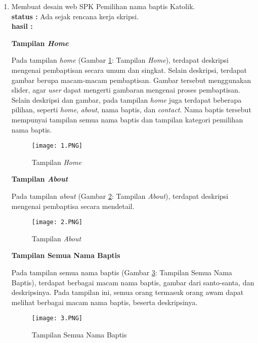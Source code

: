 \documentclass[a4paper,twoside]{article}
\begin{document}
\begin{enumerate}
\begin{enumerate}
\begin{enumerate}
\begin{itemize}
                                
                                \end{itemize}
                \end{enumerate}

\end{enumerate}
\item Membuat desain web SPK Pemilihan nama baptis Katolik.\\
		{\bf status :} Ada sejak rencana kerja skripsi.\\
		{\bf hasil :}
		
\textbf{Tampilan \textit{Home}}
		
		Pada tampilan \textit{home} (Gambar \ref{fig:home}: Tampilan \textit{Home}), terdapat deskripsi mengenai pembaptisan secara umum dan singkat. Selain deskripsi, terdapat gambar berupa macam-macam pembaptisan. Gambar tersebut menggunakan slider, agar \textit{user} dapat mengerti gambaran mengenai proses pembaptisan. Selain deskripsi dan gambar, pada tampilan \textit{home} juga terdapat beberapa pilihan, seperti \textit{home}, \textit{about}, nama baptis, dan \textit{contact}. Nama baptis tersebut mempunyai tampilan semua nama baptis dan tampilan kategori pemilihan nama baptis.
		
\begin{figure}[htbp]
		\centering
			\texttt{[image: 1.PNG]}
			\caption{Tampilan \textit{Home}}
		\label{fig:home}
	\end{figure}

\textbf{Tampilan \textit{About}}
		
		Pada tampilan \textit{about} (Gambar \ref{fig:about}: Tampilan \textit{About}), terdapat deskripsi mengenai pembaptisa secara mendetail.
		
\begin{figure}[htbp]
		\centering
			\texttt{[image: 2.PNG]}
			\caption{Tampilan \textit{About}}
		\label{fig:about}
	\end{figure}
	
	
	\textbf{Tampilan Semua Nama Baptis}
		
		Pada tampilan semua nama baptis (Gambar \ref{fig:semuanama}: Tampilan Semua Nama Baptis), terdapat berbagai macam nama baptis, gambar dari santo-santa, dan deskripsinya. Pada tampilan ini, semua orang termasuk orang awam dapat melihat berbagai macam nama baptis, beserta deskripsinya.
		
\begin{figure}[htbp]
		\centering
			\texttt{[image: 3.PNG]}
			\caption{Tampilan Semua Nama Baptis}
		\label{fig:semuanama}
	\end{figure}
	

\end{enumerate}
\end{document}
